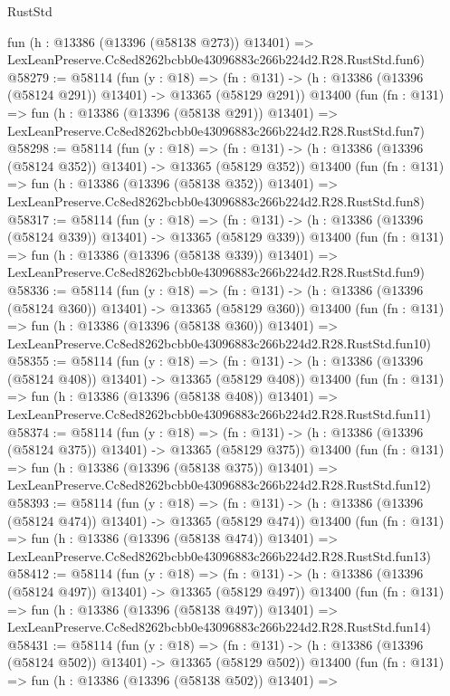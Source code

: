 \begin{lexlean}{RustStd}
\begin{coremodule}
    fun (h : @13386 (@13396 (@58138 @273)) @13401) =>
    LexLeanPreserve.Cc8ed8262bcbb0e43096883c266b224d2.R28.RustStd.fun6)
@58279 := @58114
    (fun (y : @18) =>
    (fn : @131) -> (h : @13386 (@13396 (@58124 @291)) @13401) -> @13365 (@58129 @291))
    @13400
    (fun (fn : @131) =>
    fun (h : @13386 (@13396 (@58138 @291)) @13401) =>
    LexLeanPreserve.Cc8ed8262bcbb0e43096883c266b224d2.R28.RustStd.fun7)
@58298 := @58114
    (fun (y : @18) =>
    (fn : @131) -> (h : @13386 (@13396 (@58124 @352)) @13401) -> @13365 (@58129 @352))
    @13400
    (fun (fn : @131) =>
    fun (h : @13386 (@13396 (@58138 @352)) @13401) =>
    LexLeanPreserve.Cc8ed8262bcbb0e43096883c266b224d2.R28.RustStd.fun8)
@58317 := @58114
    (fun (y : @18) =>
    (fn : @131) -> (h : @13386 (@13396 (@58124 @339)) @13401) -> @13365 (@58129 @339))
    @13400
    (fun (fn : @131) =>
    fun (h : @13386 (@13396 (@58138 @339)) @13401) =>
    LexLeanPreserve.Cc8ed8262bcbb0e43096883c266b224d2.R28.RustStd.fun9)
@58336 := @58114
    (fun (y : @18) =>
    (fn : @131) -> (h : @13386 (@13396 (@58124 @360)) @13401) -> @13365 (@58129 @360))
    @13400
    (fun (fn : @131) =>
    fun (h : @13386 (@13396 (@58138 @360)) @13401) =>
    LexLeanPreserve.Cc8ed8262bcbb0e43096883c266b224d2.R28.RustStd.fun10)
@58355 := @58114
    (fun (y : @18) =>
    (fn : @131) -> (h : @13386 (@13396 (@58124 @408)) @13401) -> @13365 (@58129 @408))
    @13400
    (fun (fn : @131) =>
    fun (h : @13386 (@13396 (@58138 @408)) @13401) =>
    LexLeanPreserve.Cc8ed8262bcbb0e43096883c266b224d2.R28.RustStd.fun11)
@58374 := @58114
    (fun (y : @18) =>
    (fn : @131) -> (h : @13386 (@13396 (@58124 @375)) @13401) -> @13365 (@58129 @375))
    @13400
    (fun (fn : @131) =>
    fun (h : @13386 (@13396 (@58138 @375)) @13401) =>
    LexLeanPreserve.Cc8ed8262bcbb0e43096883c266b224d2.R28.RustStd.fun12)
@58393 := @58114
    (fun (y : @18) =>
    (fn : @131) -> (h : @13386 (@13396 (@58124 @474)) @13401) -> @13365 (@58129 @474))
    @13400
    (fun (fn : @131) =>
    fun (h : @13386 (@13396 (@58138 @474)) @13401) =>
    LexLeanPreserve.Cc8ed8262bcbb0e43096883c266b224d2.R28.RustStd.fun13)
@58412 := @58114
    (fun (y : @18) =>
    (fn : @131) -> (h : @13386 (@13396 (@58124 @497)) @13401) -> @13365 (@58129 @497))
    @13400
    (fun (fn : @131) =>
    fun (h : @13386 (@13396 (@58138 @497)) @13401) =>
    LexLeanPreserve.Cc8ed8262bcbb0e43096883c266b224d2.R28.RustStd.fun14)
@58431 := @58114
    (fun (y : @18) =>
    (fn : @131) -> (h : @13386 (@13396 (@58124 @502)) @13401) -> @13365 (@58129 @502))
    @13400
    (fun (fn : @131) =>
    fun (h : @13386 (@13396 (@58138 @502)) @13401) =>

\end{coremodule}
\end{lexlean}
